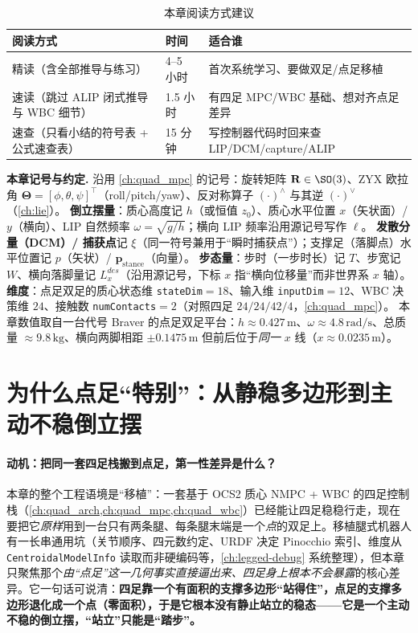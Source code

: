 \begin{table}[H]\centering\small
\caption{本章阅读方式建议}
\begin{tabular}{lll}
\toprule
阅读方式 & 时间 & 适合谁 \\
\midrule
精读（含全部推导与练习） & 4--5 小时 & 首次系统学习、要做双足/点足移植 \\
速读（跳过 ALIP 闭式推导与 WBC 细节） & 1.5 小时 & 有四足 MPC/WBC 基础、想对齐点足差异 \\
速查（只看小结的符号表 + 公式速查表） & 15 分钟 & 写控制器代码时回来查 LIP/DCM/capture/ALIP \\
\bottomrule
\end{tabular}
\end{table}

\begin{note}
\textbf{本章记号与约定.}\;
沿用 \cref{ch:quad_mpc} 的记号：旋转矩阵 $\mathbf{R}\in\SO(3)$、ZYX 欧拉角 $\boldsymbol{\Theta}=[\phi,\theta,\psi]^\top$（roll/pitch/yaw）、反对称算子 $(\cdot)^\wedge$ 与其逆 $(\cdot)^\vee$（\cref{ch:lie}）。
\textbf{倒立摆量}：质心高度记 $h$（或恒值 $z_0$）、质心水平位置 $x$（矢状面）/ $y$（横向）、LIP 自然频率 $\omega=\sqrt{g/h}$；横向 LIP 频率沿用源记号写作 $\ell$。
\textbf{发散分量（DCM）/ 捕获点}记 $\xi$（同一符号兼用于“瞬时捕获点”）；支撑足（落脚点）水平位置记 $p$（矢状）/ $\mathbf{p}_{\mathrm{stance}}$（向量）。
\textbf{步态量}：步时（一步时长）记 $T$、步宽记 $W$、横向落脚量记 $L_x^{des}$（沿用源记号，下标 $x$ 指“横向位移量”而非世界系 $x$ 轴）。
\textbf{维度}：点足双足的质心状态维 \texttt{stateDim}$=18$、输入维 \texttt{inputDim}$=12$、WBC 决策维 $24$、接触数 \texttt{numContacts}$=2$（对照四足 $24/24/42/4$，\cref{ch:quad_mpc}）。
本章数值取自一台代号 Braver 的点足双足平台：$h\approx 0.427\,\mathrm{m}$、$\omega\approx 4.8\,\mathrm{rad/s}$、总质量 $\approx 9.8\,\mathrm{kg}$、横向两脚相距 $\pm 0.1475\,\mathrm{m}$ 但前后位于\emph{同一} $x$ 线（$x\approx 0.0235\,\mathrm{m}$）。
\end{note}

\section{为什么点足“特别”：从静稳多边形到主动不稳倒立摆}
\label{sec:lb-pointfoot}

\paragraph{动机：把同一套四足栈搬到点足，第一性差异是什么？}
本章的整个工程语境是“移植”：一套基于 OCS2 质心 NMPC + WBC 的四足控制栈（\cref{ch:quad_arch,ch:quad_mpc,ch:quad_wbc}）已经能让四足稳稳行走，现在要把它\emph{原样}用到一台只有两条腿、每条腿末端是一个\emph{点}的双足上。移植腿式机器人有一长串通用坑（关节顺序、四元数约定、URDF 决定 Pinocchio 索引、维度从 \texttt{CentroidalModelInfo} 读取而非硬编码等，\cref{ch:legged-debug} 系统整理），但本章只聚焦那个\emph{由“点足”这一几何事实直接逼出来、四足身上根本不会暴露}的核心差异。它一句话可说清：\textbf{四足靠一个有面积的支撑多边形“站得住”，点足的支撑多边形退化成一个点（零面积），于是它根本没有静止站立的稳态——它是一个主动不稳的倒立摆，“站立”只能是“踏步”。}

